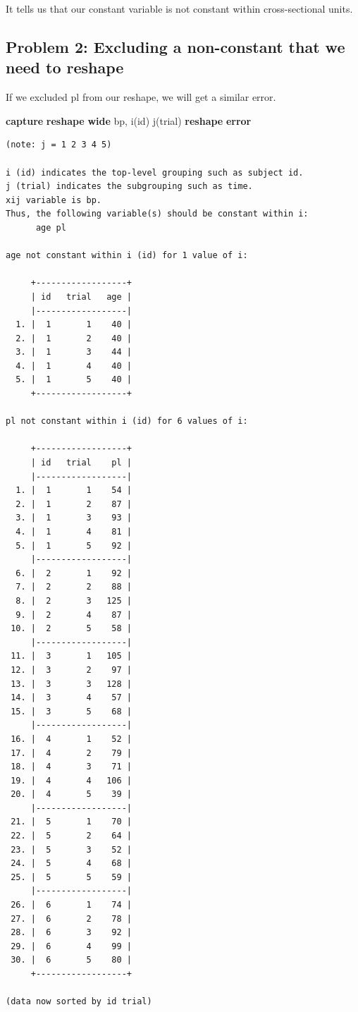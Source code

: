 \documentclass[
]{book}
\newenvironment{Shaded}{\begin{snugshade}}{\end{snugshade}}
\newcommand{\KeywordTok}[1]{\textcolor[rgb]{0.13,0.29,0.53}{\textbf{#1}}}
\newcommand{\NormalTok}[1]{#1}
\begin{document}
It tells us that our constant variable is not constant within cross-sectional units.

\subsection*{Problem 2: Excluding a non-constant that we need to reshape}\label{problem-2-excluding-a-non-constant-that-we-need-to-reshape}

If we excluded pl from our reshape, we will get a similar error.

\begin{Shaded}
\begin{Highlighting}[]
\KeywordTok{capture} \KeywordTok{reshape} \KeywordTok{wide}\NormalTok{ bp, i(id) j(trial)}
\KeywordTok{reshape} \KeywordTok{error}
\end{Highlighting}
\end{Shaded}

\begin{verbatim}
(note: j = 1 2 3 4 5)

i (id) indicates the top-level grouping such as subject id.
j (trial) indicates the subgrouping such as time.
xij variable is bp.
Thus, the following variable(s) should be constant within i:
      age pl

age not constant within i (id) for 1 value of i:

     +------------------+
     | id   trial   age |
     |------------------|
  1. |  1       1    40 |
  2. |  1       2    40 |
  3. |  1       3    44 |
  4. |  1       4    40 |
  5. |  1       5    40 |
     +------------------+

pl not constant within i (id) for 6 values of i:

     +------------------+
     | id   trial    pl |
     |------------------|
  1. |  1       1    54 |
  2. |  1       2    87 |
  3. |  1       3    93 |
  4. |  1       4    81 |
  5. |  1       5    92 |
     |------------------|
  6. |  2       1    92 |
  7. |  2       2    88 |
  8. |  2       3   125 |
  9. |  2       4    87 |
 10. |  2       5    58 |
     |------------------|
 11. |  3       1   105 |
 12. |  3       2    97 |
 13. |  3       3   128 |
 14. |  3       4    57 |
 15. |  3       5    68 |
     |------------------|
 16. |  4       1    52 |
 17. |  4       2    79 |
 18. |  4       3    71 |
 19. |  4       4   106 |
 20. |  4       5    39 |
     |------------------|
 21. |  5       1    70 |
 22. |  5       2    64 |
 23. |  5       3    52 |
 24. |  5       4    68 |
 25. |  5       5    59 |
     |------------------|
 26. |  6       1    74 |
 27. |  6       2    78 |
 28. |  6       3    92 |
 29. |  6       4    99 |
 30. |  6       5    80 |
     +------------------+

(data now sorted by id trial)
\end{verbatim}
\end{document}
